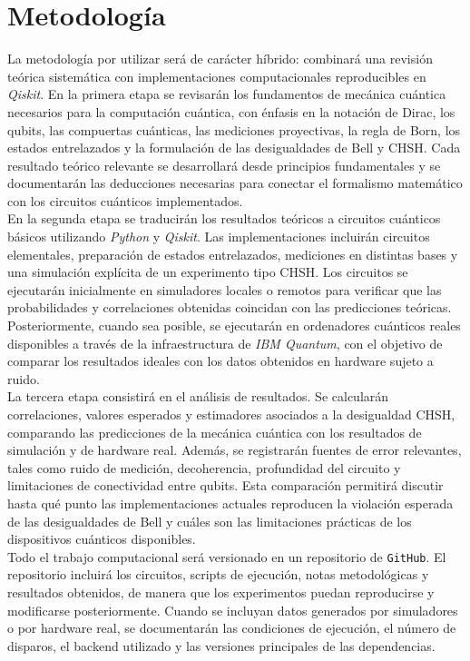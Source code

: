 \documentclass[a4paper]{article}
\begin{document}
\section{Metodología}
La metodología por utilizar será de carácter híbrido: combinará una revisión teórica sistemática con implementaciones computacionales reproducibles en \textit{Qiskit}. En la primera etapa se revisarán los fundamentos de mecánica cuántica necesarios para la computación cuántica, con énfasis en la notación de Dirac, los qubits, las compuertas cuánticas, las mediciones proyectivas, la regla de Born, los estados entrelazados y la formulación de las desigualdades de Bell y CHSH. Cada resultado teórico relevante se desarrollará desde principios fundamentales y se documentarán las deducciones necesarias para conectar el formalismo matemático con los circuitos cuánticos implementados.\\

En la segunda etapa se traducirán los resultados teóricos a circuitos cuánticos básicos utilizando \textit{Python} y \textit{Qiskit}. Las implementaciones incluirán circuitos elementales, preparación de estados entrelazados, mediciones en distintas bases y una simulación explícita de un experimento tipo CHSH. Los circuitos se ejecutarán inicialmente en simuladores locales o remotos para verificar que las probabilidades y correlaciones obtenidas coincidan con las predicciones teóricas. Posteriormente, cuando sea posible, se ejecutarán en ordenadores cuánticos reales disponibles a través de la infraestructura de \textit{IBM Quantum}, con el objetivo de comparar los resultados ideales con los datos obtenidos en hardware sujeto a ruido.\\

La tercera etapa consistirá en el análisis de resultados. Se calcularán correlaciones, valores esperados y estimadores asociados a la desigualdad CHSH, comparando las predicciones de la mecánica cuántica con los resultados de simulación y de hardware real. Además, se registrarán fuentes de error relevantes, tales como ruido de medición, decoherencia, profundidad del circuito y limitaciones de conectividad entre qubits. Esta comparación permitirá discutir hasta qué punto las implementaciones actuales reproducen la violación esperada de las desigualdades de Bell y cuáles son las limitaciones prácticas de los dispositivos cuánticos disponibles.\\

Todo el trabajo computacional será versionado en un repositorio de \texttt{GitHub}. El repositorio incluirá los circuitos, scripts de ejecución, notas metodológicas y resultados obtenidos, de manera que los experimentos puedan reproducirse y modificarse posteriormente. Cuando se incluyan datos generados por simuladores o por hardware real, se documentarán las condiciones de ejecución, el número de disparos, el backend utilizado y las versiones principales de las dependencias.\\
\end{document}
